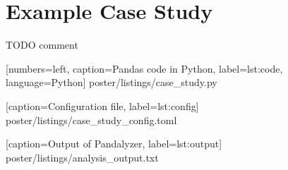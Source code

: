 \section{Example Case Study}

TODO comment






[numbers=left, caption=Pandas code in Python, label={lst:code}, language=Python]
{poster/listings/case_study.py}


[caption=Configuration file, label={lst:config}]
{poster/listings/case_study_config.toml}


[caption=Output of Pandalyzer, label={lst:output}]
{poster/listings/analysis_output.txt}
